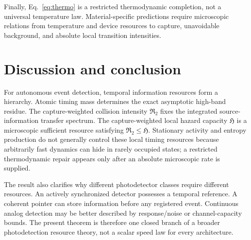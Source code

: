 \documentclass[aps,prapplied,preprint,nofootinbib]{revtex4-2}
\newcommand{\Rtwo}{\mathfrak R_2}
\newcommand{\Hcap}{\mathfrak H}
\begin{document}
Finally, Eq.~\eqref{eq:thermo} is a restricted thermodynamic completion, not a universal temperature law. Material-specific predictions require microscopic relations from temperature and device resources to capture, unavoidable background, and absolute local transition intensities.

\section{Discussion and conclusion}

For autonomous event detection, temporal information resources form a hierarchy. Atomic timing mass determines the exact asymptotic high-band residue. The capture-weighted collision intensity $\Rtwo$ fixes the integrated source-information transfer spectrum. The capture-weighted local hazard capacity $\Hcap$ is a microscopic sufficient resource satisfying $\Rtwo\le\Hcap$. Stationary activity and entropy production do not generally control these local timing resources because arbitrarily fast dynamics can hide in rarely occupied states; a restricted thermodynamic repair appears only after an absolute microscopic rate is supplied.

The result also clarifies why different photodetector classes require different resources. An actively synchronized detector possesses a temporal reference. A coherent pointer can store information before any registered event. Continuous analog detection may be better described by response/noise or channel-capacity bounds. The present theorem is therefore one closed branch of a broader photodetection resource theory, not a scalar speed law for every architecture.

\appendix



\end{document}
